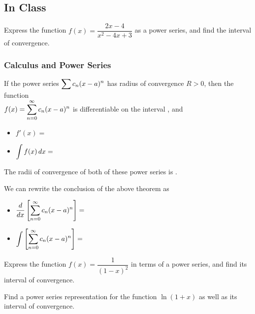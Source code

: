 \documentclass[notes]{subfiles}
\begin{document}
	\subsection*{In Class}
		\begin{ex}
			Express the function $f(x) = \dfrac{2x-4}{x^2-4x+3}$ as a power series, and find the interval of convergence.
		\end{ex}
			
	\subsubsection*{Calculus and Power Series}
		\begin{thm}
			If the power series $\displaystyle \sum c_n(x-a)^n$ has radius of convergence $R > 0$, then the function\\[15pt] $f(x) = \displaystyle \sum_{n=0}^\infty c_n(x-a)^n$ is differentiable on the interval , and\\
			\begin{itemize}
				\setlength\itemsep{20pt}
				\item $f'(x) = $
				\item $\displaystyle \int f(x)\, dx = $
			\end{itemize}$ $\\[15pt]
			
			The radii of convergence of both of these power series is .
		\end{thm}
		
		\begin{rmk}
			We can rewrite the conclusion of the above theorem as\\
			\begin{itemize}
				\setlength\itemsep{15pt}
				\item $\dfrac{d}{dx}\left[\displaystyle \sum_{n=0}^\infty c_n(x-a)^n \right] = $
				\item $\displaystyle \int \left[\displaystyle \sum_{n=0}^\infty c_n(x-a)^n\right] = $
			\end{itemize}
		\end{rmk}
			\newpage
			
		\begin{ex}
			Express the function $f(x) = \dfrac{1}{(1-x)^2}$ in terms of a power series, and find its interval of convergence.
		\end{ex}
			
		\begin{ex}
			Find a power series representation for the function $\ln (1 + x)$ as well as its interval of convergence.
		\end{ex}
			
\end{document}
